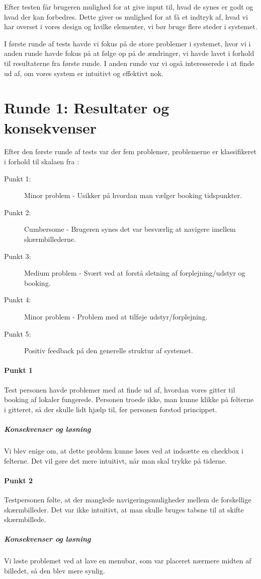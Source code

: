Efter testen får brugeren mulighed for at give input til, hvad de synes er godt og hvad der kan forbedres. Dette giver os mulighed for at få et indtryk af, hvad vi har overset i vores design og hvilke elementer, vi bør bruge flere steder i systemet.

I første runde af tests havde vi fokus på de store problemer i systemet, hvor vi i anden runde havde fokus på at følge op på de ændringer, vi havde lavet i forhold til resultaterne fra første runde. I anden runde var vi også interesserede i at finde ud af, om vores system er intuitivt og effektivt nok.

\section{Runde 1: Resultater og konsekvenser}
\label{Usability_R1}
Efter den første runde af tests var der fem problemer, problemerne er klassifikeret i forhold til skalaen fra \cite[s. 439]{SL_UID}:
\begin{description}
\item [Punkt 1:] Minor problem - Usikker på hvordan man vælger booking tidspunkter.
\item [Punkt 2:] Cumbersome - Brugeren synes det var besværlig at navigere imellem skærmbillederne.
\item [Punkt 3:] Medium problem - Svært ved at forstå sletning af forplejning/udstyr og booking.
\item [Punkt 4:] Minor problem - Problem med at tilføje udstyr/forplejning.
\item [Punkt 5:] Positiv feedback på den generelle struktur af systemet.
\end{description}

\paragraph{Punkt 1}
Test personen havde problemer med at finde ud af, hvordan vores gitter til booking af lokaler fungerede. Personen troede ikke, man kunne klikke på felterne i gitteret, så der skulle lidt hjælp til, før personen forstod princippet.
\subparagraph{Konsekvenser og løsning}
Vi blev enige om, at dette problem kunne løses ved at indsætte en checkbox i felterne. Det vil gøre det mere intuitivt, når man skal trykke på tiderne.

\paragraph{Punkt 2}
Testpersonen følte, at der manglede navigeringsmuligheder mellem de forskellige skærmbilleder. Det var ikke intuitivt, at man skulle bruges tabsne til at skifte skærmbillede.
\subparagraph{Konsekvenser og løsning}
Vi løste problemet ved at lave en menubar, som var placeret nærmere midten af billedet, så den blev mere synlig.

